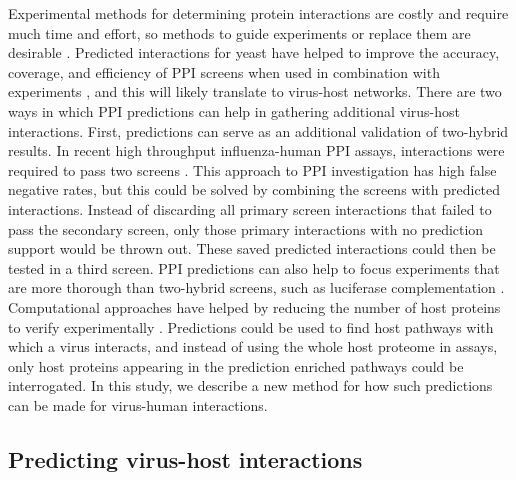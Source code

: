 Experimental methods for determining protein interactions are costly
and require much time and effort, so methods to guide experiments or
replace them are desirable
\cite{skrabanek2008computational}. Predicted interactions for yeast
have helped to improve the accuracy, coverage, and efficiency of PPI
screens when used in combination with experiments
\cite{jansen2003bayesian,lee2004probabilistic}, and this will likely
translate to virus-host networks. There are two ways in which PPI
predictions can help in gathering additional virus-host
interactions. First, predictions can serve as an additional validation
of two-hybrid results. In recent high throughput influenza-human PPI
assays, interactions were required to pass two screens
\cite{shapira2009physical}. This approach to PPI investigation has
high false negative rates, but this could be solved by combining the
screens with predicted interactions. Instead of discarding all primary
screen interactions that failed to pass the secondary screen, only
those primary interactions with no prediction support would be thrown
out. These saved predicted interactions could then be tested in a
third screen. PPI predictions can also help to focus experiments that
are more thorough than two-hybrid screens, such as luciferase
complementation \cite{misawa2010rapid}. Computational approaches have
helped by reducing the number of host proteins to verify
experimentally \cite{lee2004probabilistic}. Predictions could be used
to find host pathways with which a virus interacts, and instead of
using the whole host proteome in assays, only host proteins appearing
in the prediction enriched pathways could be interrogated. In this
study, we describe a new method for how such predictions can be made
for virus-human interactions.



\subsection{Predicting virus-host interactions} 

